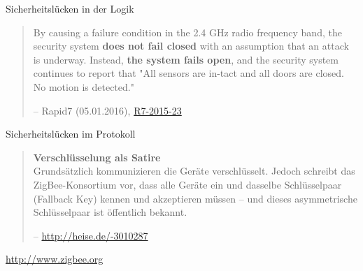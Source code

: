 \begin{frame}{Sicherheitslücken in der Logik}
  \begin{quote}
    \normalsize
    By causing a failure condition in the 2.4 GHz radio frequency band,
    the security system \textbf{does not fail closed} with an assumption that an
    attack is underway. Instead, \textbf{the system fails open}, and the security
    system continues to report that "\alert{All sensors are in-tact and all doors
    are closed. No motion is detected.}"
    \begin{flushright}
      \small
      -- Rapid7 (05.01.2016), \href{https://community.rapid7.com/community/infosec/blog/2016/01/05/r7-2015-23-comcast-xfinity-home-security-system-insecure-fail-open}{R7-2015-23}
    \end{flushright}
  \end{quote}
\end{frame}

\begin{frame}{Sicherheitslücken im Protokoll}
  \begin{quote}
    \normalsize
    \textbf{Verschlüsselung als Satire}\\
    Grundsätzlich kommunizieren die Geräte verschlüsselt.
    Jedoch schreibt das ZigBee-Konsortium vor, dass alle Geräte
    \alert{ein und dasselbe Schlüsselpaar} (Fallback Key) kennen
    und akzeptieren müssen – und dieses asymmetrische Schlüsselpaar ist
    \alert{öffentlich bekannt}.
    \begin{flushright}
      \small
      -- \url{http://heise.de/-3010287}
    \end{flushright}
  \end{quote}
\end{frame}

\begin{frame}{}
  \begin{center}

    \url{http://www.zigbee.org}
  \end{center}
\end{frame}

